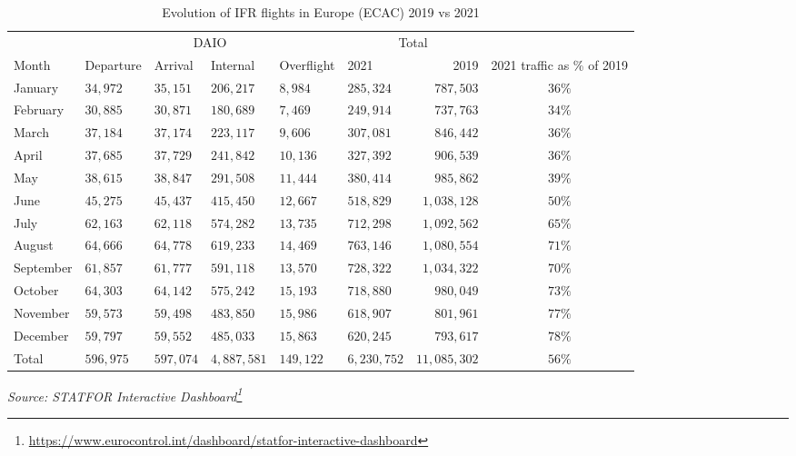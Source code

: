 \documentclass[
  11pt,
  a4paper,
]{book}
\DeclareRobustCommand{\href}[2]{#2\footnote{\url{#1}}}
\begin{document}
\hypertarget{tbl-ifr-flights-month}{}
\setlength{\LTpost}{0mm}
\begin{longtable}{llllllrc}
\caption{\label{tbl-ifr-flights-month}Evolution of IFR flights in Europe (ECAC) 2019 vs 2021 }\tabularnewline

\toprule
 & \multicolumn{4}{c}{DAIO} & \multicolumn{2}{c}{Total} &  \\ 
\cmidrule(lr){2-5} \cmidrule(lr){6-7}
Month & Departure & Arrival & Internal & Overflight & 2021 & 2019 & 2021 traffic as \% of 2019 \\ 
\midrule
January & $34,972$ & $35,151$ & $206,217$ & $8,984$ & $285,324$ & $787,503$ & $36\%$ \\ 
February & $30,885$ & $30,871$ & $180,689$ & $7,469$ & $249,914$ & $737,763$ & $34\%$ \\ 
March & $37,184$ & $37,174$ & $223,117$ & $9,606$ & $307,081$ & $846,442$ & $36\%$ \\ 
April & $37,685$ & $37,729$ & $241,842$ & $10,136$ & $327,392$ & $906,539$ & $36\%$ \\ 
May & $38,615$ & $38,847$ & $291,508$ & $11,444$ & $380,414$ & $985,862$ & $39\%$ \\ 
June & $45,275$ & $45,437$ & $415,450$ & $12,667$ & $518,829$ & $1,038,128$ & $50\%$ \\ 
July & $62,163$ & $62,118$ & $574,282$ & $13,735$ & $712,298$ & $1,092,562$ & $65\%$ \\ 
August & $64,666$ & $64,778$ & $619,233$ & $14,469$ & $763,146$ & $1,080,554$ & $71\%$ \\ 
September & $61,857$ & $61,777$ & $591,118$ & $13,570$ & $728,322$ & $1,034,322$ & $70\%$ \\ 
October & $64,303$ & $64,142$ & $575,242$ & $15,193$ & $718,880$ & $980,049$ & $73\%$ \\ 
November & $59,573$ & $59,498$ & $483,850$ & $15,986$ & $618,907$ & $801,961$ & $77\%$ \\ 
December & $59,797$ & $59,552$ & $485,033$ & $15,863$ & $620,245$ & $793,617$ & $78\%$ \\ 
Total & $596,975$ & $597,074$ & $4,887,581$ & $149,122$ & $6,230,752$ & $11,085,302$ & $56\%$ \\ 
\bottomrule
\end{longtable}
\begin{minipage}{\linewidth}
\emph{Source: \href{https://www.eurocontrol.int/dashboard/statfor-interactive-dashboard}{STATFOR Interactive Dashboard}}\\
\end{minipage}
\end{document}
